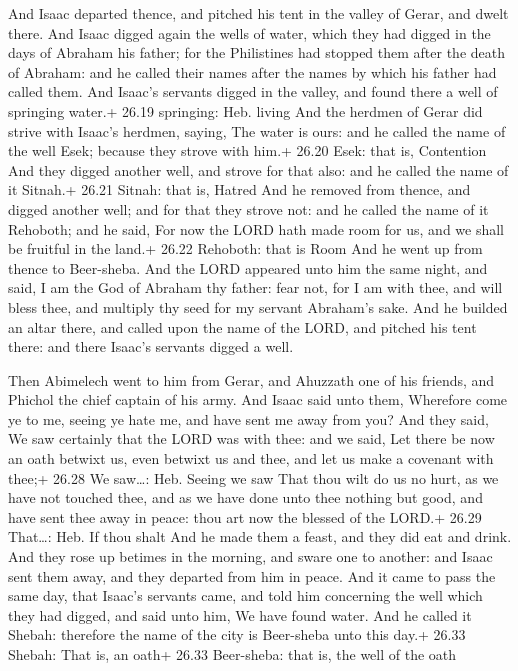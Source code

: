  And Isaac departed thence, and pitched his tent in the
valley of Gerar, and dwelt there.  And Isaac digged again
the wells of water, which they had digged in the days of Abraham his
father; for the Philistines had stopped them after the death of Abraham:
and he called their names after the names by which his father had called
them.  And Isaac's servants digged in the valley, and found
there a well of springing water.+ 26.19 springing: Heb. living
 And the herdmen of Gerar did strive with Isaac's herdmen,
saying, The water is ours: and he called the name of the well Esek;
because they strove with him.+ 26.20 Esek: that is, Contention
 And they digged another well, and strove for that also:
and he called the name of it Sitnah.+ 26.21 Sitnah: that is, Hatred
 And he removed from thence, and digged another well; and
for that they strove not: and he called the name of it Rehoboth; and he
said, For now the LORD hath made room for us, and we shall be fruitful
in the land.+ 26.22 Rehoboth: that is Room  And he went up
from thence to Beer-sheba.  And the LORD appeared unto him
the same night, and said, I am the God of Abraham thy father: fear not,
for I am with thee, and will bless thee, and multiply thy seed for my
servant Abraham's sake.  And he builded an altar there, and
called upon the name of the LORD, and pitched his tent there: and there
Isaac's servants digged a well.

 Then Abimelech went to him from Gerar, and Ahuzzath one
of his friends, and Phichol the chief captain of his army. 
And Isaac said unto them, Wherefore come ye to me, seeing ye hate me,
and have sent me away from you?  And they said, We saw
certainly that the LORD was with thee: and we said, Let there be now an
oath betwixt us, even betwixt us and thee, and let us make a covenant
with thee;+ 26.28 We saw\ldots: Heb. Seeing we saw  That
thou wilt do us no hurt, as we have not touched thee, and as we have
done unto thee nothing but good, and have sent thee away in peace: thou
art now the blessed of the LORD.+ 26.29 That\ldots: Heb. If thou shalt
 And he made them a feast, and they did eat and drink.
 And they rose up betimes in the morning, and sware one to
another: and Isaac sent them away, and they departed from him in peace.
 And it came to pass the same day, that Isaac's servants
came, and told him concerning the well which they had digged, and said
unto him, We have found water.  And he called it Shebah:
therefore the name of the city is Beer-sheba unto this day.+ 26.33
Shebah: That is, an oath+ 26.33 Beer-sheba: that is, the well of the
oath

